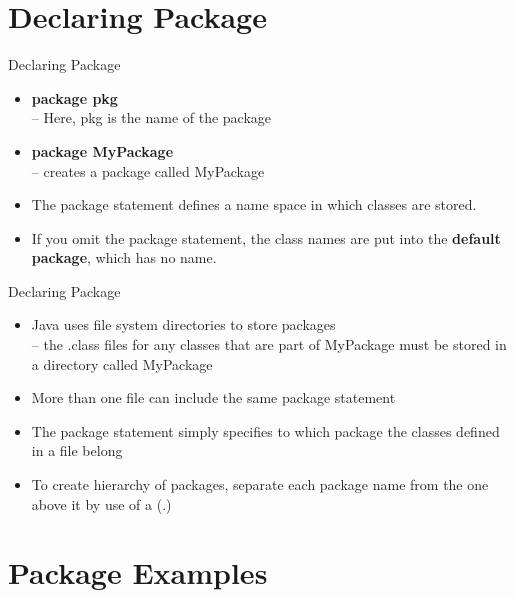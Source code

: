 \documentclass{beamer}
\begin{document}
\section{Declaring Package}


\begin{frame}{Declaring Package}
\begin{itemize}
\item \textbf{package pkg}\\
– Here, pkg is the name of the package\\
\item \textbf{package MyPackage}\\
– creates a package called MyPackage
\item The package statement defines a name space in
which classes are stored.
\item If you omit the package statement, the class names
are put into the \textbf{default package}, which has no name.
\end{itemize}
\end{frame}


\begin{frame}{Declaring Package}
\begin{itemize}
\item Java uses file system directories to store packages\\
– the .class files for any classes that are part of MyPackage
must be stored in a directory called MyPackage
\item More than one file can include the same package
statement
\item The package statement simply specifies to which
package the classes defined in a file belong
\item To create hierarchy of packages, separate each
package name from the one above it by use of a (.)
\end{itemize}
\end{frame}

\section{Package Examples}
\end{document}
